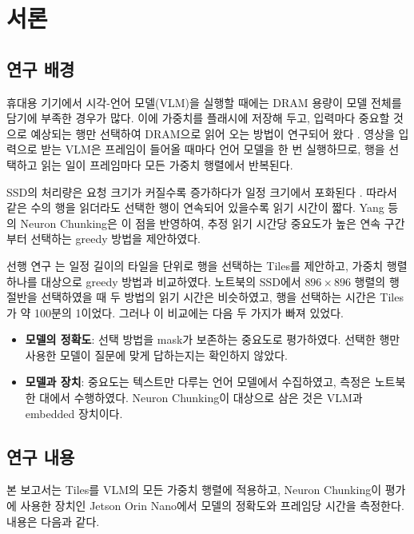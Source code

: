 \chapter{서론}\label{chap:introduction}

\section{연구 배경}\label{sec:intro-background}

휴대용 기기에서 시각-언어 모델(VLM)을 실행할 때에는 DRAM 용량이 모델 전체를 담기에 부족한 경우가 많다. 이에 가중치를 플래시에 저장해 두고, 입력마다 중요할 것으로 예상되는 행만 선택하여 DRAM으로 읽어 오는 방법이 연구되어 왔다 \cite{alizadeh2024}. 영상을 입력으로 받는 VLM은 프레임이 들어올 때마다 언어 모델을 한 번 실행하므로, 행을 선택하고 읽는 일이 프레임마다 모든 가중치 행렬에서 반복된다.

SSD의 처리량은 요청 크기가 커질수록 증가하다가 일정 크기에서 포화된다 \cite{jeong2013}. 따라서 같은 수의 행을 읽더라도 선택한 행이 연속되어 있을수록 읽기 시간이 짧다. Yang 등 \cite{yang2025}의 Neuron Chunking은 이 점을 반영하여, 추정 읽기 시간당 중요도가 높은 연속 구간부터 선택하는 greedy 방법을 제안하였다.

선행 연구 \cite{seol2026}는 일정 길이의 타일을 단위로 행을 선택하는 Tiles를 제안하고, 가중치 행렬 하나를 대상으로 greedy 방법과 비교하였다. 노트북의 SSD에서 $896\times896$ 행렬의 행 절반을 선택하였을 때 두 방법의 읽기 시간은 비슷하였고, 행을 선택하는 시간은 Tiles가 약 100분의 1이었다. 그러나 이 비교에는 다음 두 가지가 빠져 있었다.

\begin{itemize}
\item \textbf{모델의 정확도}: 선택 방법을 mask가 보존하는 중요도로 평가하였다. 선택한 행만 사용한 모델이 질문에 맞게 답하는지는 확인하지 않았다.
\item \textbf{모델과 장치}: 중요도는 텍스트만 다루는 언어 모델에서 수집하였고, 측정은 노트북 한 대에서 수행하였다. Neuron Chunking이 대상으로 삼은 것은 VLM과 embedded 장치이다.
\end{itemize}

\section{연구 내용}\label{sec:intro-contributions}

본 보고서는 Tiles를 VLM의 모든 가중치 행렬에 적용하고, Neuron Chunking이 평가에 사용한 장치인 Jetson Orin Nano에서 모델의 정확도와 프레임당 시간을 측정한다. 내용은 다음과 같다.

